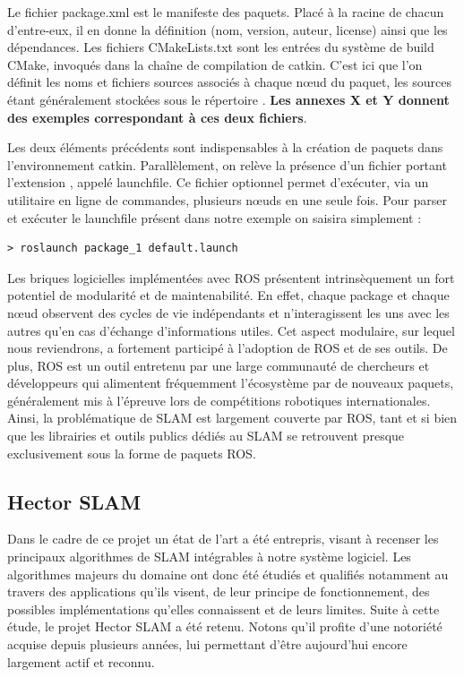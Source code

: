 Le fichier package.xml\cite{Bib_ROS_package} est le manifeste des paquets. Placé à la racine de chacun d'entre-eux, il en donne la définition (nom, version, auteur, license) ainsi que les dépendances. 
Les fichiers CMakeLists.txt\cite{Bib_ROS_manifeste} sont les entrées du système de build CMake, invoqués dans la chaîne de compilation de catkin. 
C'est ici que l'on définit les noms et fichiers sources associés à chaque n\oe{}ud du paquet, les sources étant généralement stockées sous le répertoire . 
\textbf{Les annexes X et Y donnent des exemples correspondant à ces deux fichiers}. 

Les deux éléments précédents sont indispensables à la création de paquets dans l'environnement catkin. 
Parallèlement, on relève la présence d'un fichier portant l'extension , appelé launchfile.  
Ce fichier optionnel permet d'exécuter, via un utilitaire en ligne de commandes, plusieurs n\oe{}uds en une seule fois. 
Pour parser et exécuter le launchfile présent dans notre exemple on saisira simplement :
\\
\begin{lstlisting}[style=custombash]
> roslaunch package_1 default.launch
\end{lstlisting}


Les briques logicielles implémentées avec \gls{ROS} présentent intrinsèquement un fort potentiel de modularité et de maintenabilité. 
En effet, chaque package et chaque n\oe{}ud observent des cycles de vie indépendants et n'interagissent les uns avec les autres qu'en cas d'échange d'informations utiles. 
Cet aspect modulaire, sur lequel nous reviendrons, a fortement participé à l'adoption de \gls{ROS} et de ses outils. 
De plus, \gls{ROS} est un outil entretenu par une large communauté de chercheurs et développeurs qui alimentent fréquemment l'écosystème par de nouveaux paquets, généralement mis à l'épreuve lors de compétitions robotiques internationales. 
Ainsi, la problématique de \gls{SLAM} est largement couverte par \gls{ROS}, tant et si bien que les librairies et outils publics dédiés au \gls{SLAM} se retrouvent presque exclusivement sous la forme de paquets \gls{ROS}.

  \subsection{Hector SLAM}
  \label{subsection:hector}
  
Dans le cadre de ce projet un état de l'art a été entrepris, visant à recenser les principaux algorithmes de \gls{SLAM} intégrables à notre système logiciel.
Les algorithmes majeurs du domaine ont donc été étudiés et qualifiés notamment au travers des applications qu'ils visent, de leur principe de fonctionnement, des possibles implémentations qu'elles connaissent et de leurs limites. 
Suite à cette étude, le projet \gls{Hector SLAM} a été retenu. 
Notons qu'il profite d'une notoriété acquise depuis plusieurs années, lui permettant d'être aujourd'hui encore largement actif et reconnu\cite{Bib_Hector_2016}\cite{Bib_Team_Hector}. 

